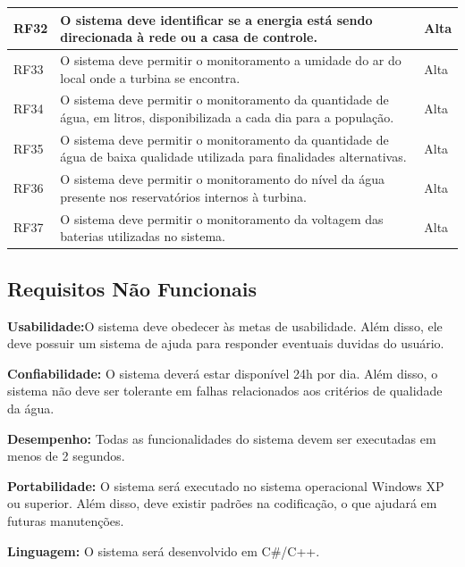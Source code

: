 \begin{longtable}{|p{4cm}|p{9cm}|p{2cm}|}
RF32& 	O sistema deve identificar se a energia está sendo direcionada à rede ou a casa de controle.	& Alta\\ \hline
RF33& 	O sistema deve permitir o monitoramento a umidade do ar do local onde a turbina se encontra. 	& Alta\\ \hline
RF34& 	O sistema deve permitir o monitoramento da quantidade de água, em litros, disponibilizada a cada dia para a população.& 	Alta\\ \hline
RF35& 	O sistema deve permitir o monitoramento da quantidade de água de baixa qualidade utilizada para finalidades alternativas.& 	Alta\\ \hline
RF36& 	O sistema deve permitir o monitoramento do nível da água presente nos reservatórios internos à turbina.	& Alta\\ \hline
RF37& 	O sistema deve permitir o monitoramento da voltagem das baterias utilizadas no sistema.	& Alta\\ \hline

\end{longtable}

\subsection*{Requisitos Não Funcionais}
\textbf{Usabilidade:}O sistema deve obedecer às metas de usabilidade. Além disso, ele deve possuir um sistema de ajuda para responder eventuais duvidas do usuário.

\textbf{Confiabilidade:} O sistema deverá estar disponível 24h por dia. Além disso, o sistema não deve ser tolerante em falhas relacionados aos critérios de qualidade da água.

\textbf{Desempenho:} Todas as funcionalidades do sistema devem ser executadas em menos de 2 segundos.

\textbf{Portabilidade:} O sistema será executado no sistema operacional Windows XP ou superior. Além disso, deve existir padrões na codificação, o que ajudará em futuras manutenções.

\textbf{Linguagem:} O sistema será desenvolvido em C\#/C++.

